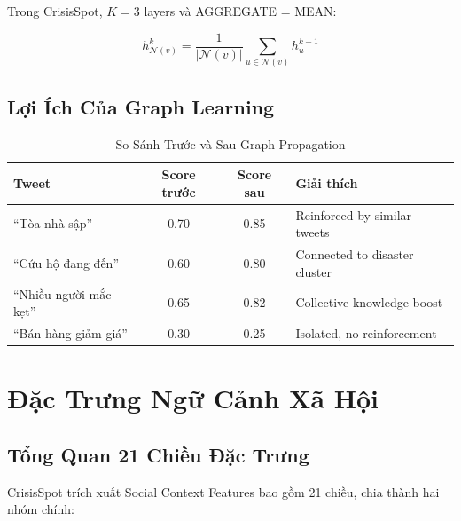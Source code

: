 \documentclass[12pt,a4paper]{article}
\begin{document}
Trong CrisisSpot, $K = 3$ layers và AGGREGATE = MEAN:

\begin{equation}
h_{\mathcal{N}(v)}^k = \frac{1}{|\mathcal{N}(v)|} \sum_{u \in \mathcal{N}(v)} h_u^{k-1}
\end{equation}

\subsection{Lợi Ích Của Graph Learning}

\begin{table}[H]
\centering
\caption{So Sánh Trước và Sau Graph Propagation}
\label{tab:graph_benefit}
\begin{tabular}{l|c|c|l}
\toprule
\textbf{Tweet} & \textbf{Score trước} & \textbf{Score sau} & \textbf{Giải thích} \\
\midrule
``Tòa nhà sập'' & 0.70 & 0.85 & Reinforced by similar tweets \\
``Cứu hộ đang đến'' & 0.60 & 0.80 & Connected to disaster cluster \\
``Nhiều người mắc kẹt'' & 0.65 & 0.82 & Collective knowledge boost \\
\midrule
``Bán hàng giảm giá'' & 0.30 & 0.25 & Isolated, no reinforcement \\
\bottomrule
\end{tabular}
\end{table}

\section{Đặc Trưng Ngữ Cảnh Xã Hội}

\subsection{Tổng Quan 21 Chiều Đặc Trưng}

CrisisSpot trích xuất Social Context Features bao gồm 21 chiều, chia thành hai nhóm chính:
\end{document}
